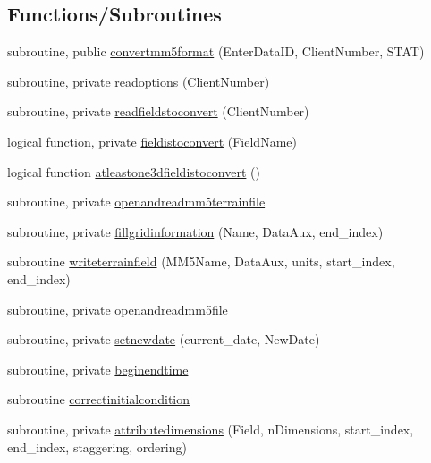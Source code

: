 \subsection*{Functions/\+Subroutines}
\begin{DoxyCompactItemize}
\item 
subroutine, public \mbox{\hyperlink{namespacemodulemm5format_a1a626b0d9d1e86eb446e37da6e498536}{convertmm5format}} (Enter\+Data\+ID, Client\+Number, S\+T\+AT)
\item 
subroutine, private \mbox{\hyperlink{namespacemodulemm5format_a97e9dde30f26c338513668851aff53f5}{readoptions}} (Client\+Number)
\item 
subroutine, private \mbox{\hyperlink{namespacemodulemm5format_aab58f65fed0eaf2db8d40727bfaaf7ab}{readfieldstoconvert}} (Client\+Number)
\item 
logical function, private \mbox{\hyperlink{namespacemodulemm5format_a06df0a4d83e5c07c6427f1e426280250}{fieldistoconvert}} (Field\+Name)
\item 
logical function \mbox{\hyperlink{namespacemodulemm5format_a34e4f7cd15886ee4867c43357fc8f717}{atleastone3dfieldistoconvert}} ()
\item 
subroutine, private \mbox{\hyperlink{namespacemodulemm5format_a1f3cc8db72c3a71a34ba6b95a7658651}{openandreadmm5terrainfile}}
\item 
subroutine, private \mbox{\hyperlink{namespacemodulemm5format_a2871229a63fac4ca43cec154d7ed93d4}{fillgridinformation}} (Name, Data\+Aux, end\+\_\+index)
\item 
subroutine \mbox{\hyperlink{namespacemodulemm5format_a5e2ead0b671ea8295a54332e57b9f3c0}{writeterrainfield}} (M\+M5\+Name, Data\+Aux, units, start\+\_\+index, end\+\_\+index)
\item 
subroutine, private \mbox{\hyperlink{namespacemodulemm5format_a4a978d934b39be4e1dd62a5701e05c93}{openandreadmm5file}}
\item 
subroutine, private \mbox{\hyperlink{namespacemodulemm5format_a87a63ca9f90961d4aa43cc6653ea5083}{setnewdate}} (current\+\_\+date, New\+Date)
\item 
subroutine, private \mbox{\hyperlink{namespacemodulemm5format_a0c8ad12e555e63fe83da5b09ae5e7126}{beginendtime}}
\item 
subroutine \mbox{\hyperlink{namespacemodulemm5format_aecf73e96a833b95d469c3682bf5df737}{correctinitialcondition}}
\item 
subroutine, private \mbox{\hyperlink{namespacemodulemm5format_a0c0413b1da7f8da860aef9b811b0c725}{attributedimensions}} (Field, n\+Dimensions, start\+\_\+index, end\+\_\+index, staggering, ordering)

\end{DoxyCompactItemize}
